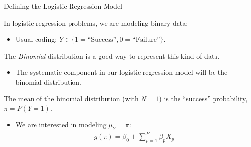 \documentclass{beamer}\usepackage[]{graphicx}\usepackage[]{color}
\begin{document}
\watermarkon %

\begin{frame}{Defining the Logistic Regression Model}
  
  In logistic regression problems, we are modeling binary data:
  \begin{itemize}
  \item Usual coding: $Y \in \{1 = \text{``Success''}, 0 = \text{``Failure''} \}$.
  \end{itemize}
  \vb
  The \emph{Binomial} distribution is a good way to represent this kind of data.
  \begin{itemize}
  \item The systematic component in our logistic regression model will be the 
    binomial distribution.
  \end{itemize}
  \vb
  The mean of the binomial distribution (with $N = 1$) is the ``success'' 
  probability, $\pi = P(Y = 1)$.
  \begin{itemize}
  \item We are interested in modeling $\mu_Y = \pi$:
    \begin{align*}
      g(\pi) = \beta_0 + \sum_{p = 1}^P \beta_p X_p
    \end{align*}
  \end{itemize}
  
  
\end{frame}
\end{document}
